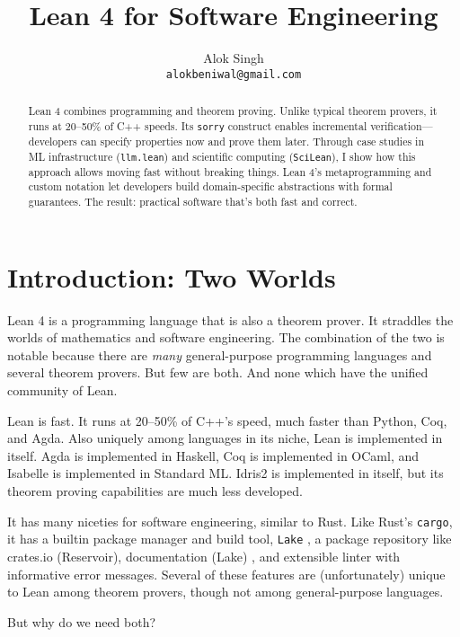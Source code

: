 \documentclass{article}
\title{Lean 4 for Software Engineering}
\author{
  Alok Singh \\
  \texttt{alokbeniwal@gmail.com} \\
}
\begin{document}
\maketitle

\begin{abstract}
  Lean 4 combines programming and theorem proving. Unlike typical theorem provers, it runs at 20--50\% of C++ speeds. Its \texttt{sorry} construct enables incremental verification---developers can specify properties now and prove them later. Through case studies in ML infrastructure (\texttt{llm.lean}) and scientific computing (\texttt{SciLean}), I show how this approach allows moving fast without breaking things. Lean 4's metaprogramming and custom notation let developers build domain-specific abstractions with formal guarantees. The result: practical software that's both fast and correct.
\end{abstract}

\tableofcontents

\section{Introduction: Two Worlds}

Lean 4 is a programming language that is also a theorem prover. It straddles the worlds of mathematics and software engineering. The combination of the two is notable because there are \textit{many} general-purpose programming languages and several theorem provers. But few are both. And none which have the unified community of Lean.

Lean is fast. It runs at 20--50\% of C++'s speed, much faster than Python, Coq, and Agda. Also uniquely among languages in its niche, Lean is implemented in itself. Agda is implemented in Haskell, Coq is implemented in OCaml, and Isabelle is implemented in Standard ML. Idris2 is implemented in itself, but its theorem proving capabilities are much less developed.

It has many niceties for software engineering, similar to Rust. Like Rust's \texttt{cargo}, it has a builtin package manager and build tool, \texttt{Lake} , a package repository like crates.io (Reservoir), documentation (Lake) , and extensible linter with informative error messages. Several of these features are (unfortunately) unique to Lean among theorem provers, though not among general-purpose languages.

But why do we need both?
\end{document}
